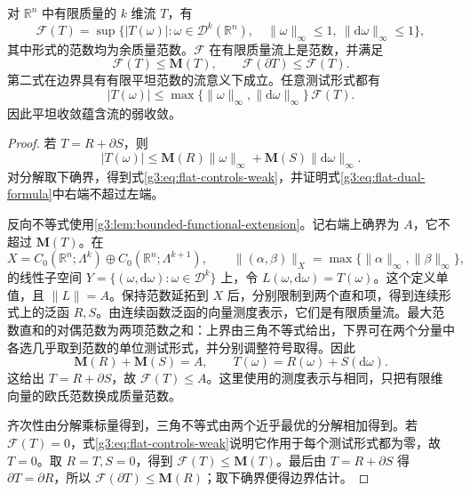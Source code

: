 \begin{proposition}\label{g3:prop:flat-norm-duality}
	对 \(\mathbb R^n\) 中有限质量的 \(k\) 维流 \(T\)，有
	\begin{equation}\label{g3:eq:flat-dual-formula}
		\mathcal F(T)=\sup\{|T(\omega)|:
		\omega\in\mathcal D^k(\mathbb R^n),\quad
		\|\omega\|_\infty\le1,\ \|\mathrm d\omega\|_\infty\le1\},
	\end{equation}
	其中形式的范数均为余质量范数。\(\mathcal F\) 在有限质量流上是范数，并满足
	\[
		\mathcal F(T)\le\mathbf M(T),\qquad
		\mathcal F(\partial T)\le\mathcal F(T).
	\]
	第二式在边界具有有限平坦范数的流意义下成立。任意测试形式都有
	\begin{equation}\label{g3:eq:flat-controls-weak}
		|T(\omega)|\le\max\{\|\omega\|_\infty,\|\mathrm d\omega\|_\infty\}\,\mathcal F(T).
	\end{equation}
	因此平坦收敛蕴含流的弱收敛。
\end{proposition}
\begin{proof}
	若 \(T=R+\partial S\)，则
	\[
		|T(\omega)|\le\mathbf M(R)\|\omega\|_\infty
		+\mathbf M(S)\|\mathrm d\omega\|_\infty.
	\]
	对分解取下确界，得到式\eqref{g3:eq:flat-controls-weak}，并证明式\eqref{g3:eq:flat-dual-formula}中右端不超过左端。

	反向不等式使用\cref{g3:lem:bounded-functional-extension}。记右端上确界为 \(A\)，它不超过 \(\mathbf M(T)\)。在
	\[
		X=C_0(\mathbb R^n;\Lambda^k)\oplus C_0(\mathbb R^n;\Lambda^{k+1}),
		\qquad \|(\alpha,\beta)\|_X=\max\{\|\alpha\|_\infty,\|\beta\|_\infty\},
	\]
	的线性子空间 \(Y=\{(\omega,\mathrm d\omega):\omega\in\mathcal D^k\}\) 上，令 \(L(\omega,\mathrm d\omega)=T(\omega)\)。这个定义单值，且 \(\|L\|=A\)。保持范数延拓到 \(X\) 后，分别限制到两个直和项，得到连续形式上的泛函 \(R,S\)。由连续函数泛函的向量测度表示，它们是有限质量流。最大范数直和的对偶范数为两项范数之和：上界由三角不等式给出，下界可在两个分量中各选几乎取到范数的单位测试形式，并分别调整符号取得。因此
	\[
		\mathbf M(R)+\mathbf M(S)=A,\qquad
		T(\omega)=R(\omega)+S(\mathrm d\omega).
	\]
	这给出 \(T=R+\partial S\)，故 \(\mathcal F(T)\le A\)。这里使用的测度表示与相同，只把有限维向量的欧氏范数换成质量范数。

	齐次性由分解乘标量得到，三角不等式由两个近乎最优的分解相加得到。若 \(\mathcal F(T)=0\)，式\eqref{g3:eq:flat-controls-weak}说明它作用于每个测试形式都为零，故 \(T=0\)。取 \(R=T,S=0\)，得到 \(\mathcal F(T)\le\mathbf M(T)\)。最后由 \(T=R+\partial S\) 得 \(\partial T=\partial R\)，所以 \(\mathcal F(\partial T)\le\mathbf M(R)\)；取下确界便得边界估计。
\end{proof}

